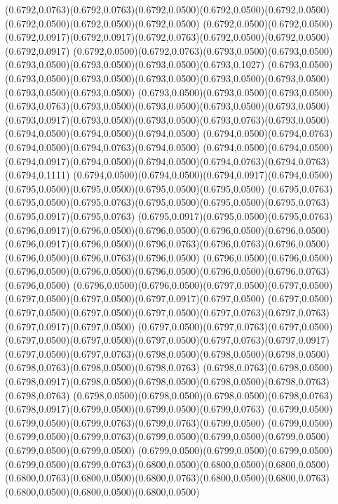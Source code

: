 (0.6792,0.0763)(0.6792,0.0763)(0.6792,0.0500)(0.6792,0.0500)(0.6792,0.0500)(0.6792,0.0500)(0.6792,0.0500)(0.6792,0.0500)
(0.6792,0.0500)(0.6792,0.0500)(0.6792,0.0917)(0.6792,0.0917)(0.6792,0.0763)(0.6792,0.0500)(0.6792,0.0500)(0.6792,0.0917)
(0.6792,0.0500)(0.6792,0.0763)(0.6793,0.0500)(0.6793,0.0500)(0.6793,0.0500)(0.6793,0.0500)(0.6793,0.0500)(0.6793,0.1027)
(0.6793,0.0500)(0.6793,0.0500)(0.6793,0.0500)(0.6793,0.0500)(0.6793,0.0500)(0.6793,0.0500)(0.6793,0.0500)(0.6793,0.0500)
(0.6793,0.0500)(0.6793,0.0500)(0.6793,0.0500)(0.6793,0.0763)(0.6793,0.0500)(0.6793,0.0500)(0.6793,0.0500)(0.6793,0.0500)
(0.6793,0.0917)(0.6793,0.0500)(0.6793,0.0500)(0.6793,0.0763)(0.6793,0.0500)(0.6794,0.0500)(0.6794,0.0500)(0.6794,0.0500)
(0.6794,0.0500)(0.6794,0.0763)(0.6794,0.0500)(0.6794,0.0763)(0.6794,0.0500)
\PST@Solid(0.6794,0.0500)(0.6794,0.0500)(0.6794,0.0917)(0.6794,0.0500)(0.6794,0.0500)(0.6794,0.0763)(0.6794,0.0763)(0.6794,0.1111)
(0.6794,0.0500)(0.6794,0.0500)(0.6794,0.0917)(0.6794,0.0500)(0.6795,0.0500)(0.6795,0.0500)(0.6795,0.0500)(0.6795,0.0500)
(0.6795,0.0763)(0.6795,0.0500)(0.6795,0.0763)(0.6795,0.0500)(0.6795,0.0500)(0.6795,0.0763)(0.6795,0.0917)(0.6795,0.0763)
(0.6795,0.0917)(0.6795,0.0500)(0.6795,0.0763)(0.6796,0.0917)(0.6796,0.0500)(0.6796,0.0500)(0.6796,0.0500)(0.6796,0.0500)
(0.6796,0.0917)(0.6796,0.0500)(0.6796,0.0763)(0.6796,0.0763)(0.6796,0.0500)(0.6796,0.0500)(0.6796,0.0763)(0.6796,0.0500)
(0.6796,0.0500)(0.6796,0.0500)(0.6796,0.0500)(0.6796,0.0500)(0.6796,0.0500)(0.6796,0.0500)(0.6796,0.0763)(0.6796,0.0500)
(0.6796,0.0500)(0.6796,0.0500)(0.6797,0.0500)(0.6797,0.0500)(0.6797,0.0500)(0.6797,0.0500)(0.6797,0.0917)(0.6797,0.0500)
(0.6797,0.0500)(0.6797,0.0500)(0.6797,0.0500)(0.6797,0.0500)(0.6797,0.0763)(0.6797,0.0763)(0.6797,0.0917)(0.6797,0.0500)
(0.6797,0.0500)(0.6797,0.0763)(0.6797,0.0500)(0.6797,0.0500)(0.6797,0.0500)(0.6797,0.0500)(0.6797,0.0763)(0.6797,0.0917)
(0.6797,0.0500)(0.6797,0.0763)(0.6798,0.0500)(0.6798,0.0500)(0.6798,0.0500)(0.6798,0.0763)(0.6798,0.0500)(0.6798,0.0763)
(0.6798,0.0763)(0.6798,0.0500)(0.6798,0.0917)(0.6798,0.0500)(0.6798,0.0500)(0.6798,0.0500)(0.6798,0.0763)(0.6798,0.0763)
(0.6798,0.0500)(0.6798,0.0500)(0.6798,0.0500)(0.6798,0.0763)(0.6798,0.0917)(0.6799,0.0500)(0.6799,0.0500)(0.6799,0.0763)
(0.6799,0.0500)(0.6799,0.0500)(0.6799,0.0763)(0.6799,0.0763)(0.6799,0.0500)
\PST@Solid(0.6799,0.0500)(0.6799,0.0500)(0.6799,0.0763)(0.6799,0.0500)(0.6799,0.0500)(0.6799,0.0500)(0.6799,0.0500)(0.6799,0.0500)
(0.6799,0.0500)(0.6799,0.0500)(0.6799,0.0500)(0.6799,0.0500)(0.6799,0.0763)(0.6800,0.0500)(0.6800,0.0500)(0.6800,0.0500)
(0.6800,0.0763)(0.6800,0.0500)(0.6800,0.0763)(0.6800,0.0500)(0.6800,0.0763)(0.6800,0.0500)(0.6800,0.0500)(0.6800,0.0500)
